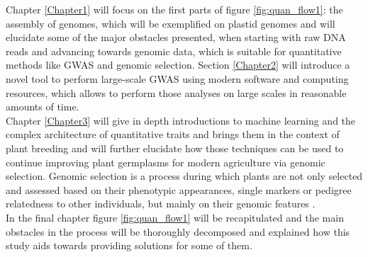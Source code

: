 Chapter \ref{Chapter1} will focus on the first parts of figure \ref{fig:quan_flow1}: the
assembly of genomes, which will be exemplified on plastid genomes and will elucidate some
of the major obstacles presented, when starting with raw DNA reads and advancing towards
genomic data, which is suitable for quantitative methods like GWAS and genomic
selection. Section \ref{Chapter2} will introduce a novel tool to perform large-scale GWAS
using modern software and computing resources, which allows to perform those analyses on large scales in reasonable amounts of time. \\
Chapter \ref{Chapter3} will give in depth introductions to machine learning and the
complex architecture of quantitative traits and brings them in the context of plant
breeding and will further elucidate how those techniques can be used to continue improving
plant germplasms for modern agriculture via genomic selection. Genomic selection is a
process during which plants are not only selected and assessed based on their phenotypic
appearances, single markers or pedigree relatedness
to other individuals, but mainly on their genomic features \cite{hayes2001}. \\
In the final chapter figure \ref{fig:quan_flow1} will be recapitulated and the main
obstacles in the process will be thoroughly decomposed and explained how this study aids
towards providing solutions for some of them.





